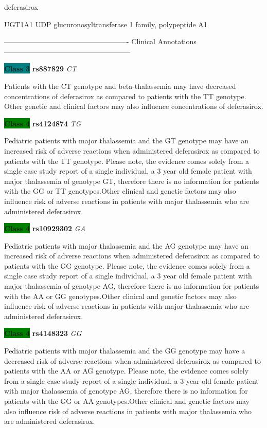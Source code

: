 \documentclass{resume} %
\begin{document}
\begin{rSection}{ deferasirox }
\begin{rSubsection}{ UGT1A1 }{ UDP glucuronosyltransferase 1 family, polypeptide A1 }{}{}
\item[]

\item[] ---------------------------------------------------- Clinical Annotations -----------------------------------------------------\newline
\item \textbf{\colorbox{teal} {Class 3}} \textbf{ rs887829 } \textit{ CT }
\item[] Patients with the CT genotype and beta-thalassemia may have decreased concentrations of deferasirox as compared to patients with the TT genotype. Other genetic and clinical factors may also influence concentrations of deferasirox.\item \textbf{\colorbox{green} {Class 4}} \textbf{ rs4124874 } \textit{ TG }
\item[] Pediatric patients with major thalassemia and the GT genotype may have an increased risk of adverse reactions when administered deferasirox as compared to patients with the TT genotype. Please note, the evidence comes solely from a single case study report of a single individual, a 3 year old female patient with major thalassemia of genotype GT, therefore there is no information for patients with the GG or TT genotypes.Other clinical and genetic factors may also influence risk of adverse reactions in patients with major thalassemia who are administered deferasirox. \item \textbf{\colorbox{green} {Class 4}} \textbf{ rs10929302 } \textit{ GA }
\item[] Pediatric patients with major thalassemia and the AG genotype may have an increased risk of adverse reactions when administered deferasirox as compared to patients with the GG genotype. Please note, the evidence comes solely from a single case study report of a single individual, a 3 year old female patient with major thalassemia of genotype AG, therefore there is no information for patients with the AA or GG genotypes.Other clinical and genetic factors may also influence risk of adverse reactions in patients with major thalassemia who are administered deferasirox.\item \textbf{\colorbox{green} {Class 4}} \textbf{ rs4148323 } \textit{ GG }
\item[] Pediatric patients with major thalassemia and the GG genotype may have a decreased risk of adverse reactions when administered deferasirox as compared to patients with the AA or AG genotype. Please note, the evidence comes solely from a single case study report of a single individual, a 3 year old female patient with major thalassemia of genotype AG, therefore there is no information for patients with the GG or AA genotypes.Other clinical and genetic factors may also influence risk of adverse reactions in patients with major thalassemia who are administered deferasirox.
\end{rSubsection}


\end{rSection}
\end{document}
